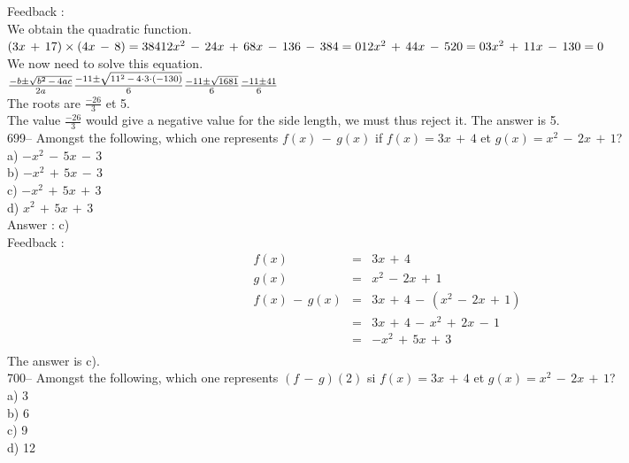 \documentclass[letterpaper, 12pt]{article}
\begin{document}
Feedback : \\
We obtain the quadratic function.  \\
$(3x\,+\,17)\times(4x\,-\,8)=384\\
12x^{2}\,-\,24x\,+\,68x\,-\,136\,-\,384=0\\
12x^{2}\,+\,44x\,-\,520=0\\
3x^{2}\,+\,11x\,-\,130=0$\\
We now need to solve this equation.\\[2mm]
$\frac{-b\pm\sqrt{b^{2}\,-\,4ac}}{2a}\\[2mm]
\frac{-11\pm \sqrt{11^{2}\,-\,4\cdot3\cdot(-130)}}{6}\\[2mm]
\frac{-11\pm \sqrt{1681}}{6}\\[2mm]
\frac{-11\pm 41}{6}$\\[2mm]
The roots are $\frac{-26}{3}$ et 5.\\[2mm]
The value $\frac{-26}{3}$ would give a negative value for the side length, we must thus reject it.  The answer is 5.\\

699-- Amongst the following, which one represents $f(x)\,-\,g(x)$
if $f(x)=3x\,+\,4$ et $g(x)=x^{2}\,-\,2x\,+\,1$?\\
a) $-x^{2}\,-\,5x\,-\,3$\\
b) $-x^{2}\,+\,5x\,-\,3$\\
c) $-x^{2}\,+\,5x\,+\,3$\\
d) $x^{2}\,+\,5x\,+\,3$\\

Answer : c)\\

Feedback : \\
\begin{eqnarray*}
f(x)&=&3x\,+\,4\\
g(x)&=&x^{2}\,-\,2x\,+\,1\\
f(x)\,-\,g(x)&=&3x\,+\,4\,-\,(x^{2}\,-\,2x\,+\,1)\\
&=&3x\,+\,4\,-\,x^{2}\,+\,2x\,-\,1\\
&=&-x^{2}\,+\,5x\,+\,3\\
\end{eqnarray*}
The answer is c).\\

700-- Amongst the following, which one represents $(f\,-\,g)(2)$
si $f(x)=3x\,+\,4$ et $g(x)=x^{2}\,-\,2x\,+\,1$?\\
a) 3\\
b) 6\\
c) 9\\
d) 12\\
\end{document}
